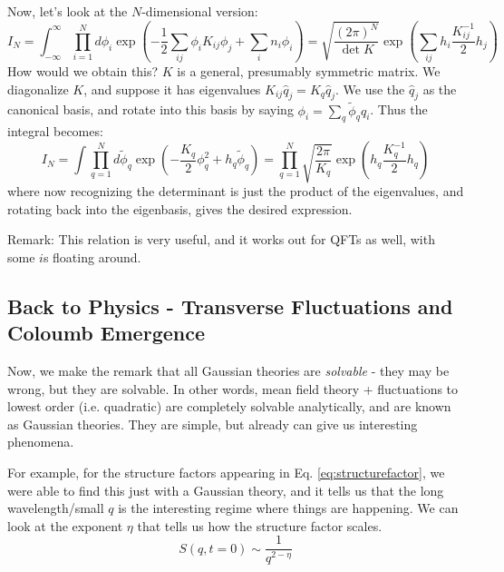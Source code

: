 Now, let's look at the $N$-dimensional version:
\begin{equation}
    I_N = \int_{-\infty}^\infty \prod_{i=1}^N d\phi_i \exp(-\frac{1}{2}\sum_{ij}\phi_i K_{ij}\phi_j + \sum_i n_i \phi_i) = \sqrt{\frac{(2\pi)^N}{\det K}}\exp(\sum_{ij}h_i \frac{K_{ij}^{-1}}{2}h_j)
\end{equation}
How would we obtain this? $K$ is a general, presumably symmetric matrix. We diagonalize $K$, and suppose it has eigenvalues $K_{ij}\hat{q}_j = K_q \hat{q}_j$. We use the $\hat{q}_j$ as the canonical basis, and rotate into this basis by saying $\phi_i = \sum_q \tilde{\phi}_q \hat{q}_i$. Thus the integral becomes:
\begin{equation}
    I_N = \int \prod_{q=1}^N d\tilde{\phi}_q \exp(-\frac{K_q}{2}\phi_q^2 + h_q\tilde{\phi}_q) = \prod_{q=1}^N\sqrt{\frac{2\pi}{K_q}}\exp(h_q\frac{K_q^{-1}}{2}h_q)
\end{equation}
where now recognizing the determinant is just the product of the eigenvalues, and rotating back into the eigenbasis, gives the desired expression.

Remark: This relation is very useful, and it works out for QFTs as well, with some $i$s floating around.

\subsection{Back to Physics - Transverse Fluctuations and Coloumb Emergence}
Now, we make the remark that all Gaussian theories are \emph{solvable} - they may be wrong, but they are solvable. In other words, mean field theory + fluctuations to lowest order (i.e. quadratic) are completely solvable analytically, and are known as Gaussian theories. They are simple, but already can give us interesting phenomena.

For example, for the structure factors appearing in Eq. \eqref{eq:structurefactor}, we were able to find this just with a Gaussian theory, and it tells us that the long wavelength/small $q$ is the interesting regime where things are happening. We can look at the exponent $\eta$ that tells us how the structure factor scales.
\begin{equation}
    S(q, t=0) \sim \frac{1}{q^{2 - \eta}}
\end{equation}

